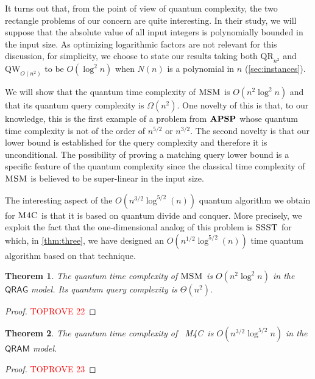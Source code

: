 \documentclass[12pt]{article}
\newcommand{\qr}{\mathrm{QR}}
\newcommand{\qw}{\mathrm{QW}}
\newcommand{\MaxSubM}{\textsc{MSM}}
\newcommand{\MaxFourC}{\textsc{M4C}}
\newcommand{\SSST}{\textsc{SSST}}
\newcommand{\APSPc}{\bf{APSP}}
\newtheorem{theorem}{Theorem}
\theoremstyle{definition}
\begin{document}
It turns out that, from the point of view of quantum complexity, the two rectangle problems of our concern are quite interesting. In their study, we will suppose that the absolute value of all input integers is polynomially bounded in the input size. As optimizing logarithmic factors are not relevant for this discussion, for simplicity, we choose to state our results taking both $\qr_{n^2}$ and $\qw_{O(n^2)}$ to be $O(\log^2n)$ when $N(n)$ is a polynomial in $n$ (\cref{sec:instances}).


We will show that the quantum time complexity of $\MaxSubM$ is $O(n^{2} \log^2 n)$ and that its quantum query complexity is $\Omega(n^2).$ One novelty of this is that, to our knowledge, this is the first example of a problem from $\APSPc$ whose quantum time complexity is not of the order of $n^{5/2}$ or $n^{3/2}$.
The second novelty is that our lower bound is established for the query complexity and therefore it is unconditional.
The possibility of proving a matching query lower bound is a specific feature of the quantum complexity since the classical time complexity of $\MaxSubM$ is believed to be super-linear in the input size.

The interesting aspect of the ${O}(n^{3/2} \log^{5/2} (n))$ quantum algorithm we obtain for $\MaxFourC$ is that it is based on quantum divide and conquer.
More precisely, we exploit the fact that the one-dimensional analog of this problem is  $\SSST$ for which, in \cref{thm:three}, we have designed an $O(n^{1/2} \log^{5/2}(n))$ time quantum algorithm based on that technique. 

\begin{theorem}
\label{thm:msm}
The quantum time complexity of $\MaxSubM$ is $O(n^{2}\log^2 n)$ in the $\mathsf{QRAG}$ model. 
Its quantum query complexity is $\Theta(n^2).$ 
\end{theorem}

\begin{proof}\textcolor{red}{TOPROVE 22}\end{proof}


\begin{theorem}
\label{thm:mfc}
The quantum time complexity of \ \MaxFourC ~is ${O}(n^{3/2} \log^{5/2} n)$ in the $\mathsf{QRAM}$ model. 
\end{theorem}

\begin{proof}\textcolor{red}{TOPROVE 23}\end{proof}
\end{document}
